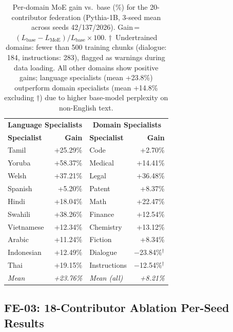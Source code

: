 \documentclass{article}
\begin{document}
\begin{table}[h]
\centering
\caption{Per-domain MoE gain vs.\ base (\%) for the 20-contributor federation (Pythia-1B, 3-seed mean across seeds 42/137/2026). Gain\,=\,$(L_\text{base}-L_\text{MoE})/L_\text{base}\times100$. $\dagger$~Undertrained domains: fewer than 500 training chunks (dialogue: 184, instructions: 283), flagged as warnings during data loading. All other domains show positive gains; language specialists (mean +23.8\%) outperform domain specialists (mean +14.8\% excluding $\dagger$) due to higher base-model perplexity on non-English text.}
\label{tab:exp3_perdomain_app}
\small
\begin{tabular}{lrlr}
\toprule
\multicolumn{2}{c}{\textbf{Language Specialists}} & \multicolumn{2}{c}{\textbf{Domain Specialists}} \\
\textbf{Specialist} & \textbf{Gain} & \textbf{Specialist} & \textbf{Gain} \\
\midrule
Tamil      & +25.29\% & Code         & +2.70\%  \\
Yoruba     & +58.37\% & Medical      & +14.41\% \\
Welsh      & +37.21\% & Legal        & +36.48\% \\
Spanish    & +5.20\%  & Patent       & +8.37\%  \\
Hindi      & +18.04\% & Math         & +22.47\% \\
Swahili    & +38.26\% & Finance      & +12.54\% \\
Vietnamese & +12.34\% & Chemistry    & +13.12\% \\
Arabic     & +11.24\% & Fiction      & +8.34\%  \\
Indonesian & +12.49\% & Dialogue     & $-$23.84\%$^\dagger$ \\
Thai       & +19.15\% & Instructions & $-$12.54\%$^\dagger$ \\
\midrule
\textit{Mean} & \textit{+23.76\%} & \textit{Mean (all)} & \textit{+8.21\%} \\
\bottomrule
\end{tabular}
\end{table}

\subsection{FE-03: 18-Contributor Ablation Per-Seed Results}
\label{app:fe03_table}
\end{document}
